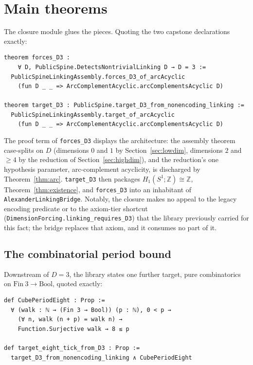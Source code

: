 \documentclass[11pt]{article}
\theoremstyle{definition}
\newcommand{\Z}{\mathbb{Z}}
\newcommand{\lean}[1]{\texttt{#1}}
\begin{document}
\section{Main theorems}
\label{sec:main}

The closure module glues the pieces. Quoting the two capstone declarations exactly:

\begin{lstlisting}
theorem forces_D3 :
    ∀ D, PublicSpine.DetectsNontrivialLinking D → D = 3 :=
  PublicSpineLinkingAssembly.forces_D3_of_arcAcyclic
    (fun D _ _ => ArcComplementAcyclic.arcComplementsAcyclic D)

theorem target_D3 : PublicSpine.target_D3_from_nonencoding_linking :=
  PublicSpineLinkingAssembly.target_of_arcAcyclic
    (fun D _ _ => ArcComplementAcyclic.arcComplementsAcyclic D)
\end{lstlisting}

The proof term of \lean{forces\_D3} displays the architecture: the assembly theorem case-splits on $D$ (dimensions $0$ and $1$ by Section~\ref{sec:lowdim}, dimensions $2$ and $\geq 4$ by the reduction of Section~\ref{sec:highdim}), and the reduction's one hypothesis parameter, arc-complement acyclicity, is discharged by Theorem~\ref{thm:arc}. \lean{target\_D3} then packages $H_1(S^1;\Z) \cong \Z$, Theorem~\ref{thm:existence}, and \lean{forces\_D3} into an inhabitant of \lean{AlexanderLinkingBridge}. Notably, the closure makes no appeal to the legacy encoding predicate or to the axiom-tier shortcut (\lean{DimensionForcing.linking\_requires\_D3}) that the library previously carried for this fact; the bridge replaces that axiom, and it consumes no part of it.

\subsection{The combinatorial period bound}

Downstream of $D = 3$, the library states one further target, pure combinatorics on $\mathrm{Fin}\ 3 \to \mathrm{Bool}$, quoted exactly:

\begin{lstlisting}
def CubePeriodEight : Prop :=
  ∀ (walk : ℕ → (Fin 3 → Bool)) (p : ℕ), 0 < p →
    (∀ n, walk (n + p) = walk n) →
    Function.Surjective walk → 8 ≤ p

def target_eight_tick_from_D3 : Prop :=
  target_D3_from_nonencoding_linking ∧ CubePeriodEight
\end{lstlisting}
\end{document}
